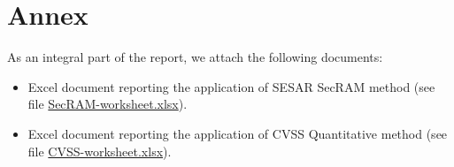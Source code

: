\section{Annex}
\label{sec:annex}

As an integral part of the report, we attach the following documents:

\begin{itemize}
    \item Excel document reporting the application of SESAR SecRAM method (see file \url{SecRAM-worksheet.xlsx}).
    \item Excel document reporting the application of CVSS Quantitative method (see file \url{CVSS-worksheet.xlsx}).
\end{itemize}

\clearpage